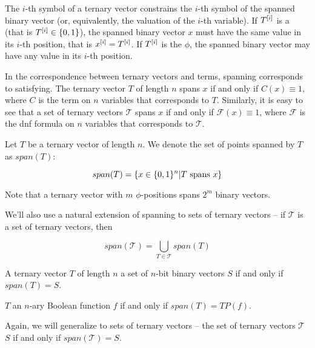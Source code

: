 The $i$-th symbol of a ternary vector
constrains the $i$-th symbol of the spanned binary vector
(or, equivalently, the valuation of the $i$-th variable).
If $T^{[i]}$ is a 
(that is $T^{[i]} \in \{0, 1\}$),
the spanned binary vector $x$
must have the same value
in its $i$-th position,
that is $x^{[i]} = T^{[i]}$.
If $T^{[i]}$ is the  $\phi$,
the spanned binary vector
may have any value in its $i$-th position.

In the correspondence between ternary vectors and terms,
spanning corresponds to satisfying.
The ternary vector $T$ of length $n$ spans $x$
if and only if
$C(x) \equiv 1$,
where $C$ is the term on $n$ variables
that corresponds to $T$.
Similarly,
it is easy to see that
a set of ternary vectors $\mathcal{T}$ spans $x$
if and only if
$\mathcal{F}(x) \equiv 1$,
where $\mathcal{F}$ is the \acrshort{dnf} formula
on $n$ variables
that corresponds to $\mathcal{T}$.

\begin{definition}
Let $T$ be a ternary vector of length $n$.
We denote the set of points spanned by $T$
as $span(T)$:

\begin{equation*}
span(T) = \{
x \in \{0, 1\}^n |
T\text{ spans }x
\}
\end{equation*}
\end{definition}

Note that a ternary vector
with $m$ $\phi$-positions
spans $2^m$ binary vectors.

We'll also use a natural extension of spanning
to sets of ternary vectors --
if $\mathcal{T}$ is a set of ternary vectors, then

\begin{equation*}
span(\mathcal{T}) =
\bigcup_{T \in \mathcal{T}} span(T)
\end{equation*}

\begin{definition}
A ternary vector $T$ of length $n$
a set of $n$-bit binary vectors $S$
if and only if
$span(T) = S$.

$T$ 
an $n$-ary Boolean function $f$
if and only if
$span(T) = TP(f)$.
\end{definition}

Again,
we will generalize 
to sets of ternary vectors
-- the set of ternary vectors $\mathcal{T}$
 $S$
if and only if
$span(\mathcal{T}) = S$.

